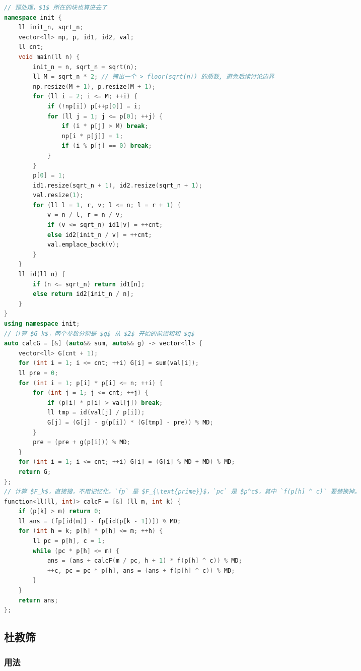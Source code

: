 \documentclass[10pt]{ctexart}
\begin{document}
\begin{multicols}{3}
\begin{lstlisting}[language={C++}]
// 预处理，$1$ 所在的块也算进去了
namespace init {
    ll init_n, sqrt_n;
    vector<ll> np, p, id1, id2, val;
    ll cnt;
    void main(ll n) {
        init_n = n, sqrt_n = sqrt(n);
        ll M = sqrt_n * 2; // 筛出一个 > floor(sqrt(n)) 的质数, 避免后续讨论边界
        np.resize(M + 1), p.resize(M + 1);
        for (ll i = 2; i <= M; ++i) {
            if (!np[i]) p[++p[0]] = i;
            for (ll j = 1; j <= p[0]; ++j) {
                if (i * p[j] > M) break;
                np[i * p[j]] = 1;
                if (i % p[j] == 0) break;
            }
        }
        p[0] = 1;
        id1.resize(sqrt_n + 1), id2.resize(sqrt_n + 1);
        val.resize(1);
        for (ll l = 1, r, v; l <= n; l = r + 1) {
            v = n / l, r = n / v;
            if (v <= sqrt_n) id1[v] = ++cnt;
            else id2[init_n / v] = ++cnt;
            val.emplace_back(v);
        }
    }
    ll id(ll n) {
        if (n <= sqrt_n) return id1[n];
        else return id2[init_n / n];
    }
}
using namespace init;
// 计算 $G_k$，两个参数分别是 $g$ 从 $2$ 开始的前缀和和 $g$
auto calcG = [&] (auto&& sum, auto&& g) -> vector<ll> {
    vector<ll> G(cnt + 1);
    for (int i = 1; i <= cnt; ++i) G[i] = sum(val[i]);
    ll pre = 0;
    for (int i = 1; p[i] * p[i] <= n; ++i) {
        for (int j = 1; j <= cnt; ++j) {
            if (p[i] * p[i] > val[j]) break;
            ll tmp = id(val[j] / p[i]);
            G[j] = (G[j] - g(p[i]) * (G[tmp] - pre)) % MD;
        }
        pre = (pre + g(p[i])) % MD;
    }
    for (int i = 1; i <= cnt; ++i) G[i] = (G[i] % MD + MD) % MD;
    return G;
};
// 计算 $F_k$，直接搜，不用记忆化。`fp` 是 $F_{\text{prime}}$，`pc` 是 $p^c$，其中 `f(p[h] ^ c)` 要替换掉。
function<ll(ll, int)> calcF = [&] (ll m, int k) {
    if (p[k] > m) return 0;
    ll ans = (fp[id(m)] - fp[id(p[k - 1])]) % MD;
    for (int h = k; p[h] * p[h] <= m; ++h) {
        ll pc = p[h], c = 1;
        while (pc * p[h] <= m) {
            ans = (ans + calcF(m / pc, h + 1) * f(p[h] ^ c)) % MD;
            ++c, pc = pc * p[h], ans = (ans + f(p[h] ^ c)) % MD;
        }
    }
    return ans;
};
\end{lstlisting}

    \subsection{杜教筛}\label{ux675cux6559ux7b5b}

    \subsubsection{用法}\label{ux7528ux6cd5-10}


\end{multicols}
\end{document}
